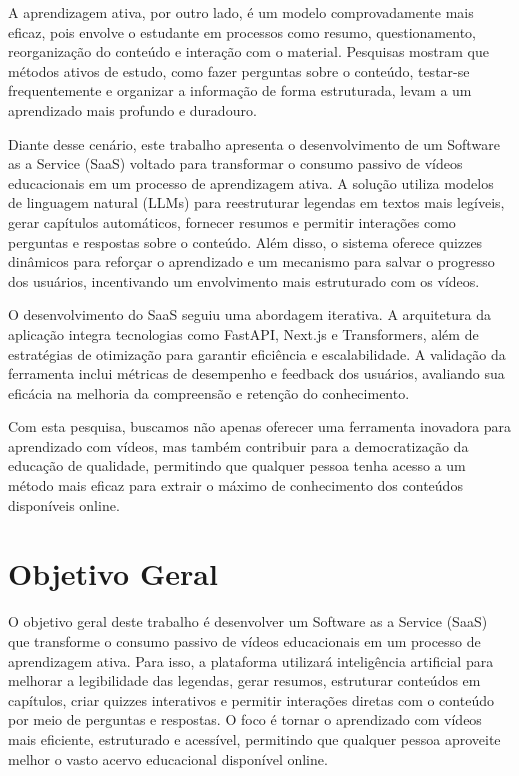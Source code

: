 \documentclass[tcc,capa]{texufpel}
\begin{document}
A aprendizagem ativa, por outro lado, é um modelo comprovadamente mais eficaz, pois envolve o estudante em processos como resumo, questionamento, reorganização do conteúdo e interação com o material. Pesquisas mostram que métodos ativos de estudo, como fazer perguntas sobre o conteúdo, testar-se frequentemente e organizar a informação de forma estruturada, levam a um aprendizado mais profundo e duradouro. 

Diante desse cenário, este trabalho apresenta o desenvolvimento de um Software as a Service (SaaS) voltado para transformar o consumo passivo de vídeos educacionais em um processo de aprendizagem ativa. A solução utiliza modelos de linguagem natural (LLMs) para reestruturar legendas em textos mais legíveis, gerar capítulos automáticos, fornecer resumos e permitir interações como perguntas e respostas sobre o conteúdo. Além disso, o sistema oferece quizzes dinâmicos para reforçar o aprendizado e um mecanismo para salvar o progresso dos usuários, incentivando um envolvimento mais estruturado com os vídeos.

O desenvolvimento do SaaS seguiu uma abordagem iterativa. A arquitetura da aplicação integra tecnologias como FastAPI, Next.js e Transformers, além de estratégias de otimização para garantir eficiência e escalabilidade. A validação da ferramenta inclui métricas de desempenho e feedback dos usuários, avaliando sua eficácia na melhoria da compreensão e retenção do conhecimento.

Com esta pesquisa, buscamos não apenas oferecer uma ferramenta inovadora para aprendizado com vídeos, mas também contribuir para a democratização da educação de qualidade, permitindo que qualquer pessoa tenha acesso a um método mais eficaz para extrair o máximo de conhecimento dos conteúdos disponíveis online.

\section{Objetivo Geral}
O objetivo geral deste trabalho é desenvolver um Software as a Service (SaaS) que transforme o consumo passivo de vídeos educacionais em um processo de aprendizagem ativa. Para isso, a plataforma utilizará inteligência artificial para melhorar a legibilidade das legendas, gerar resumos, estruturar conteúdos em capítulos, criar quizzes interativos e permitir interações diretas com o conteúdo por meio de perguntas e respostas. O foco é tornar o aprendizado com vídeos mais eficiente, estruturado e acessível, permitindo que qualquer pessoa aproveite melhor o vasto acervo educacional disponível online.
\end{document}
